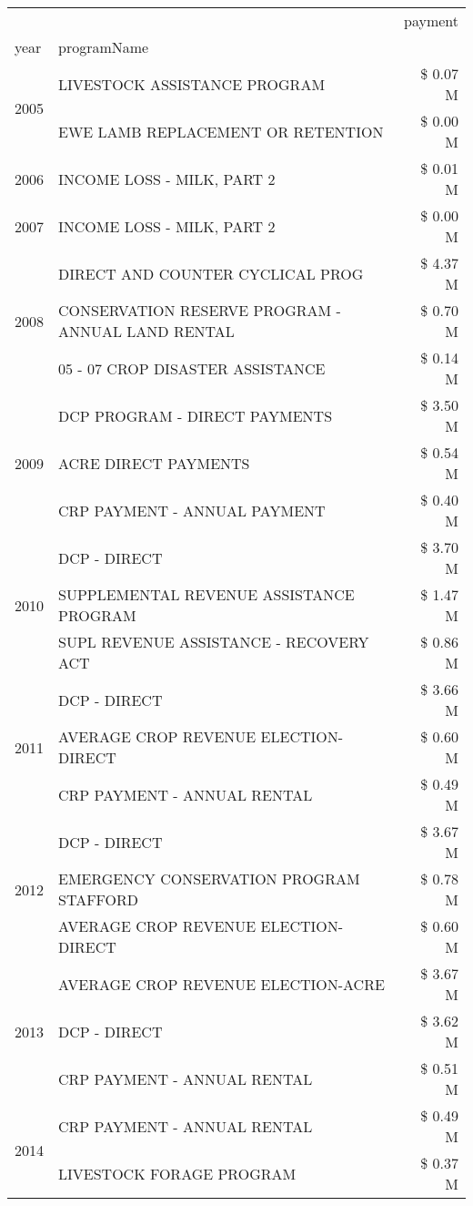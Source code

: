 \begin{tabular}{llr}
\toprule
 &  & payment \\
year & programName &  \\
\midrule
\multirow[t]{2}{*}{2005} & LIVESTOCK ASSISTANCE PROGRAM & \$ 0.07 M \\
 & EWE LAMB REPLACEMENT OR RETENTION & \$ 0.00 M \\
\cline{1-3}
2006 & INCOME LOSS - MILK, PART 2 & \$ 0.01 M \\
\cline{1-3}
2007 & INCOME LOSS - MILK, PART 2 & \$ 0.00 M \\
\cline{1-3}
\multirow[t]{3}{*}{2008} & DIRECT AND COUNTER CYCLICAL PROG & \$ 4.37 M \\
 & CONSERVATION RESERVE PROGRAM - ANNUAL LAND RENTAL & \$ 0.70 M \\
 & 05 - 07 CROP DISASTER ASSISTANCE & \$ 0.14 M \\
\cline{1-3}
\multirow[t]{3}{*}{2009} & DCP PROGRAM - DIRECT PAYMENTS & \$ 3.50 M \\
 & ACRE DIRECT PAYMENTS & \$ 0.54 M \\
 & CRP PAYMENT - ANNUAL PAYMENT & \$ 0.40 M \\
\cline{1-3}
\multirow[t]{3}{*}{2010} & DCP - DIRECT & \$ 3.70 M \\
 & SUPPLEMENTAL REVENUE ASSISTANCE PROGRAM & \$ 1.47 M \\
 & SUPL REVENUE ASSISTANCE - RECOVERY ACT & \$ 0.86 M \\
\cline{1-3}
\multirow[t]{3}{*}{2011} & DCP - DIRECT & \$ 3.66 M \\
 & AVERAGE CROP REVENUE ELECTION-DIRECT & \$ 0.60 M \\
 & CRP PAYMENT - ANNUAL RENTAL & \$ 0.49 M \\
\cline{1-3}
\multirow[t]{3}{*}{2012} & DCP - DIRECT & \$ 3.67 M \\
 & EMERGENCY CONSERVATION PROGRAM STAFFORD & \$ 0.78 M \\
 & AVERAGE CROP REVENUE ELECTION-DIRECT & \$ 0.60 M \\
\cline{1-3}
\multirow[t]{3}{*}{2013} & AVERAGE CROP REVENUE ELECTION-ACRE & \$ 3.67 M \\
 & DCP - DIRECT & \$ 3.62 M \\
 & CRP PAYMENT - ANNUAL RENTAL & \$ 0.51 M \\
\cline{1-3}
\multirow[t]{3}{*}{2014} & CRP PAYMENT - ANNUAL RENTAL & \$ 0.49 M \\
 & LIVESTOCK FORAGE PROGRAM & \$ 0.37 M \\

\end{tabular}
